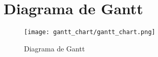 \section{Diagrama de Gantt}
\label{sec:gantt_chart}

  \begin{figure}[H]
    \centering
    \texttt{[image: gantt\_chart/gantt\_chart.png]}
    \caption{Diagrama de Gantt}
    \label{fig:gantt_chart}
  \end{figure}